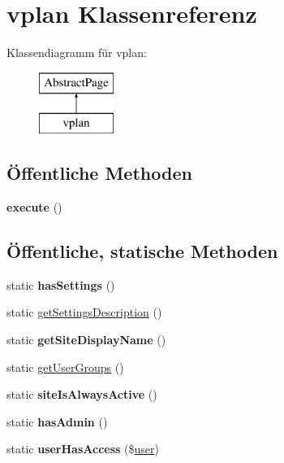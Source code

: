 \hypertarget{classvplan}{}\section{vplan Klassenreferenz}
\label{classvplan}
Klassendiagramm für vplan\+:\begin{figure}[H]
\begin{center}
\leavevmode
\includegraphics[height=2.000000cm]{classvplan}
\end{center}
\end{figure}
\subsection*{Öffentliche Methoden}
\begin{DoxyCompactItemize}
\item 
\mbox{\label{classvplan_a5def77bb05fa71495afe27811eb6b04e}} 
{\bfseries execute} ()
\end{DoxyCompactItemize}
\subsection*{Öffentliche, statische Methoden}
\begin{DoxyCompactItemize}
\item 
\mbox{\label{classvplan_a3c9572918b9a337095c0465c3172056f}} 
static {\bfseries has\+Settings} ()
\item 
static \mbox{\hyperlink{classvplan_a6b33712013b53420f3ef89c3c6d406ae}{get\+Settings\+Description}} ()
\item 
\mbox{\label{classvplan_ab503ff530ad3977c124f9432834a764f}} 
static {\bfseries get\+Site\+Display\+Name} ()
\item 
static \mbox{\hyperlink{classvplan_aac77500cfdc4bb62e53666612c2f9dff}{get\+User\+Groups}} ()
\item 
\mbox{\label{classvplan_a00ac9748e8a0af90b1826caa66e34533}} 
static {\bfseries site\+Is\+Always\+Active} ()
\item 
\mbox{\label{classvplan_a11efaaf09630aec6acb8561cf4d535f6}} 
static {\bfseries has\+Admin} ()
\item 
\mbox{\label{classvplan_a88ead18b9795d8d24650369d61ba6873}} 
static {\bfseries user\+Has\+Access} (\$\mbox{\hyperlink{classuser}{user}})
\end{DoxyCompactItemize}
